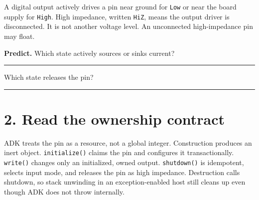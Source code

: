 \documentclass[11pt]{article}
\begin{document}
A digital output actively drives a pin near ground for \texttt{Low} or near
the board supply for \texttt{High}. High impedance, written \texttt{HiZ},
means the output driver is disconnected. It is not another voltage level.
An unconnected high-impedance pin may float.

\begin{center}
\end{center}

\textbf{Predict.} Which state actively sources or sinks current?
\rule{3cm}{0.35pt}\quad Which state releases the pin?
\rule{3cm}{0.35pt}

\section*{2. Read the ownership contract}

ADK treats the pin as a resource, not a global integer. Construction produces
an inert object. \texttt{initialize()} claims the pin and configures it
transactionally. \texttt{write()} changes only an initialized, owned output.
\texttt{shutdown()} is idempotent, selects input mode, and releases the pin as
high impedance.
Destruction calls shutdown, so stack unwinding in an exception-enabled host
still cleans up even though ADK does not throw internally.
\end{document}
